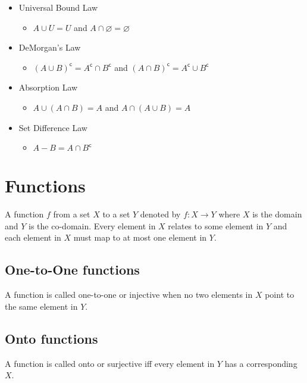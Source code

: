 \documentclass[landscape, letterpaper]{article}
\renewcommand{\complement}[1]{{#1}^\mathsf{c}}
\begin{document}
\begin{multicols}{2}
\begin{itemize}
        \item Universal Bound Law
              \begin{itemize}
                  \item $A \cup U = U$ and $A  \cap \varnothing = \varnothing$
              \end{itemize}
        \item DeMorgan's Law
              \begin{itemize}
                  \item $\complement{(A \cup B)} = \complement{A} \cap \complement{B}$ and $\complement{(A \cap B)} = \complement{A} \cup \complement{B}$
              \end{itemize}
        \item Absorption Law
              \begin{itemize}
                  \item $A \cup (A \cap B) = A$ and $A \cap (A \cup B) = A$
              \end{itemize}
        \item Set Difference Law
              \begin{itemize}
                  \item $A-B = A \cap \complement{B}$
              \end{itemize}
    \end{itemize}
    \section*{Functions}
    A function $f$ from a set $X$ to a set $Y$ denoted by $f: X \to Y$ where $X$ is the domain and $Y$ is the co-domain.
    Every element in $X$ relates to some element in $Y$ and each element in $X$ must map to at most one element in $Y$.
    \subsection*{One-to-One functions}
    A function is called one-to-one or injective when no two elements in $X$ point to the same element in $Y$.
    \subsection*{Onto functions}
    A function is called onto or surjective iff every element in $Y$ has a corresponding $X$.

\end{multicols}
\end{document}
